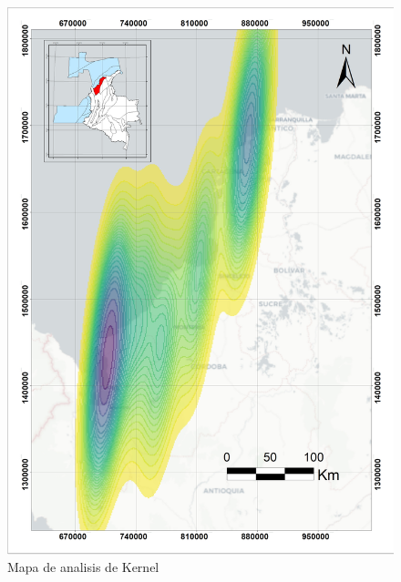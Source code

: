 \documentclass{ifacconf}
\begin{document}
\begin{figure}
	\centering
	\includegraphics[width=1\linewidth]{"img/Kernel Desnsity de Volcanes de lodo"}
	\caption[KDvolcanes]{Mapa de analisis de Kernel}
	\label{fig:kernel-desnsity-de-volcanes-de-lodo}
\end{figure}
\end{document}
